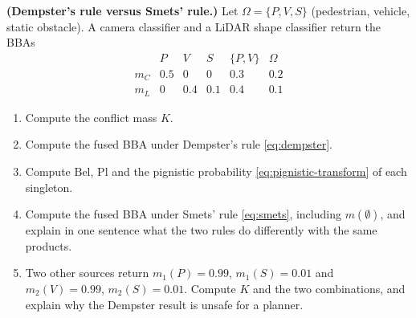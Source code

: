 \documentclass[graybox,envcountchap]{style/SNmono}
\begin{document}
\begin{prob}\label{prob:ch03:7}
\textbf{(Dempster's rule versus Smets' rule.)} Let $\Omega=\{P,V,S\}$ (pedestrian, vehicle, static obstacle). A camera classifier and a LiDAR shape classifier return the BBAs
\begin{equation*}
\begin{array}{c|ccccc}
 & P & V & S & \{P,V\} & \Omega\\
\hline
m_C & 0.5 & 0 & 0 & 0.3 & 0.2\\
m_L & 0 & 0.4 & 0.1 & 0.4 & 0.1
\end{array}
\end{equation*}
\begin{enumerate}
\item[(a)] Compute the conflict mass $K$.
\item[(b)] Compute the fused BBA under Dempster's rule \eqref{eq:dempster}.
\item[(c)] Compute $\mathrm{Bel}$, $\mathrm{Pl}$ and the pignistic probability \eqref{eq:pignistic-transform} of each singleton.
\item[(d)] Compute the fused BBA under Smets' rule \eqref{eq:smets}, including $m(\emptyset)$, and explain in one sentence what the two rules do differently with the same products.
\item[(e)] Two other sources return $m_1(P)=0.99$, $m_1(S)=0.01$ and $m_2(V)=0.99$, $m_2(S)=0.01$. Compute $K$ and the two combinations, and explain why the Dempster result is unsafe for a planner.
\end{enumerate}
\end{prob}
\end{document}
